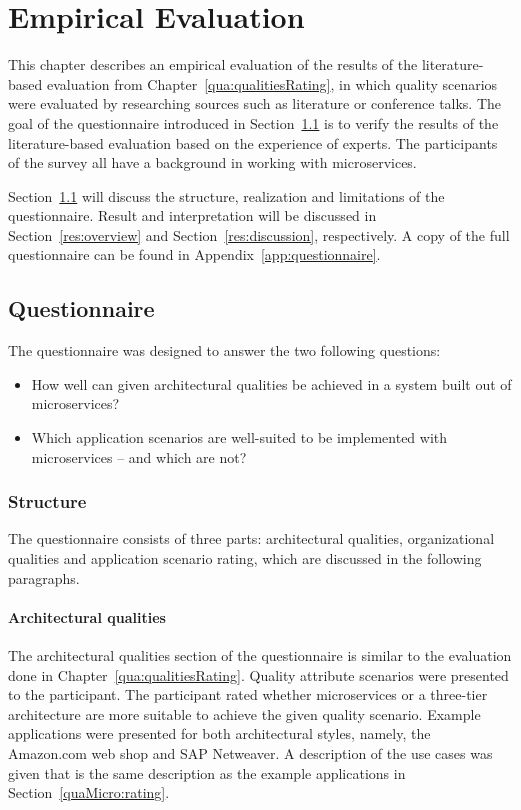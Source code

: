 \chapter{Empirical Evaluation}
\label{que:empiricalEvaluation}

This chapter describes an empirical evaluation of the results of the literature-based evaluation from Chapter~\ref{qua:qualitiesRating}, in which quality scenarios were evaluated by researching sources such as literature or conference talks.
The goal of the questionnaire introduced in Section~\ref{questionnaire} is to verify the results of the literature-based evaluation based on the experience of experts.
The participants of the survey all have a background in working with microservices.

Section~\ref{questionnaire} will discuss the structure, realization and limitations of the questionnaire.
Result and interpretation will be discussed in Section~\ref{res:overview} and Section~\ref{res:discussion}, respectively.
A copy of the full questionnaire can be found in Appendix~\ref{app:questionnaire}.

\section{Questionnaire}
\label{questionnaire}
The questionnaire was designed to answer the two following questions:
\begin{itemize}
\item How well can given architectural qualities be achieved in a system built out of microservices?
\item Which application scenarios are well-suited to be implemented with microservices -- and which are not?
\end{itemize}

\subsection{Structure}
The questionnaire consists of three parts: architectural qualities, organizational qualities and application scenario rating, which are discussed in the following paragraphs.

\subsubsection{Architectural qualities}
\label{questionnaire:archQualities}
The architectural qualities section of the questionnaire is similar to the evaluation done in Chapter~\ref{qua:qualitiesRating}.
Quality attribute scenarios were presented to the participant.
The participant rated whether microservices or a three-tier architecture are more suitable to achieve the given quality scenario.
Example applications were presented for both architectural styles, namely, the Amazon.com web shop and SAP Netweaver.
A description of the use cases was given that is the same description as the example applications in Section~\ref{quaMicro:rating}.

